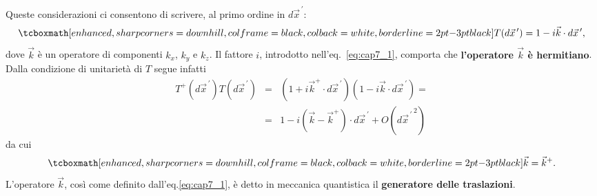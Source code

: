 \documentclass[a4paper,12pt,oneside]{book}
\begin{document}
Queste considerazioni ci consentono di scrivere, al primo ordine in $d{\vec{x}}^{\, \prime}$:
	\begin{equation}
		\label{eq:cap7_1}
		\tcboxmath[enhanced, sharp corners=downhill, colframe=black, colback=white, borderline={2pt}{-3pt}{black}]{
			T(d{\vec{x}}^{\, \prime})=1-i\vec{k}\cdot d{\vec{x}}^{\, \prime} ,
			}
	\end{equation}
dove $\vec{k}$ è un operatore di componenti $k_x$, $k_y$ e $k_z$. Il fattore $i$, introdotto nell'eq.~\eqref{eq:cap7_1}, comporta che \textbf{l'operatore ${\vec{k}}$ è hermitiano}. Dalla condizione di unitarietà di $T$ segue infatti
	\begin{eqnarray}
		T^+(d{\vec{x}}^{\, \prime}) T(d{\vec{x}}^{\, \prime}) & = & \left(1+i\vec{k}^{+}\cdot d{\vec{x}}^{\, \prime}\right) \left(1-i\vec{k}\cdot d{\vec{x}}^{\, \prime}\right) = \nonumber \\ 
		& = & 1-i\left(\vec{k}-\vec{k}^{+}\right)\cdot d{\vec{x}}^{\, \prime}+O({d{\vec{x}}^{\, \prime} }^{\, 2}) 
	\end{eqnarray}
da cui
	\begin{equation}
		\tcboxmath[enhanced, sharp corners=downhill, colframe=black, colback=white, borderline={2pt}{-3pt}{black}]{	
			\vec{k}=\vec{k}^+ .
			}
	\end{equation}
L'operatore $\vec{k}$, così come definito dall'eq.\eqref{eq:cap7_1}, è detto in meccanica quantistica il \textbf{generatore delle traslazioni}.\\
\end{document}
